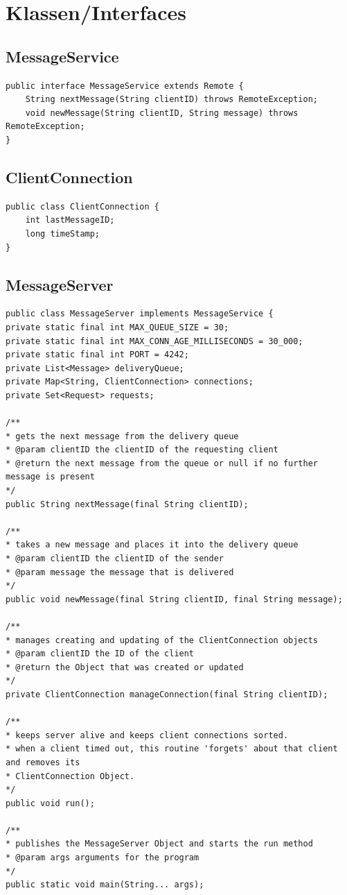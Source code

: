 \documentclass[a4paper, 12pt]{scrartcl}
\begin{document}
\section{Klassen/Interfaces}
\subsection{MessageService}
\begin{lstlisting}
public interface MessageService extends Remote {
	String nextMessage(String clientID) throws RemoteException;
	void newMessage(String clientID, String message) throws RemoteException;
}
\end{lstlisting}

\subsection{ClientConnection}
\begin{lstlisting}
public class ClientConnection {
    int lastMessageID;
	long timeStamp;
}
\end{lstlisting}

\subsection{MessageServer}
\begin{lstlisting}
public class MessageServer implements MessageService {
private static final int MAX_QUEUE_SIZE = 30;
private static final int MAX_CONN_AGE_MILLISECONDS = 30_000;
private static final int PORT = 4242;
private List<Message> deliveryQueue;
private Map<String, ClientConnection> connections;
private Set<Request> requests;

/**
* gets the next message from the delivery queue
* @param clientID the clientID of the requesting client
* @return the next message from the queue or null if no further message is present
*/
public String nextMessage(final String clientID);

/**
* takes a new message and places it into the delivery queue
* @param clientID the clientID of the sender
* @param message the message that is delivered
*/
public void newMessage(final String clientID, final String message);

/**
* manages creating and updating of the ClientConnection objects
* @param clientID the ID of the client
* @return the Object that was created or updated
*/
private ClientConnection manageConnection(final String clientID);

/**
* keeps server alive and keeps client connections sorted.
* when a client timed out, this routine 'forgets' about that client and removes its
* ClientConnection Object.
*/
public void run();

/**
* publishes the MessageServer Object and starts the run method
* @param args arguments for the program
*/
public static void main(String... args);
\end{lstlisting}
\end{document}
